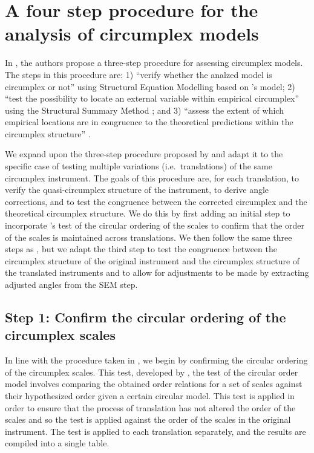 \documentclass[
  authoryear,
  preprint,
  3p]{elsarticle}
\begin{document}
\section{A four step procedure for the analysis of circumplex
models}\label{a-four-step-procedure-for-the-analysis-of-circumplex-models}

In \citet{Rogoza2021three}, the authors propose a three-step procedure
for assessing circumplex models. The steps in this procedure are: 1)
``verify whether the analzed model is circumplex or not'' using
Structural Equation Modelling based on \citet{Browne1992Circumplex}'s
model; 2) ``test the possibility to locate an external variable within
empirical circumplex'' using the Structural Summary Method
\citep{Gurtman1994differentiating}; and 3) ``assess the extent of which
empirical locations are in congruence to the theoretical predictions
within the circumplex structure'' \citep{Rogoza2021three}.

We expand upon the three-step procedure proposed by
\citet{Rogoza2021three} and adapt it to the specific case of testing
multiple variations (i.e.~translations) of the same circumplex
instrument. The goals of this procedure are, for each translation, to
verify the quasi-circumplex structure of the instrument, to derive angle
corrections, and to test the congruence between the corrected circumplex
and the theoretical circumplex structure. We do this by first adding an
initial step to incorporate \citet{Rounds2000Tinsley}'s test of the
circular ordering of the scales to confirm that the order of the scales
is maintained across translations. We then follow the same three steps
as \citet{Rogoza2021three}, but we adapt the third step to test the
congruence between the circumplex structure of the original instrument
and the circumplex structure of the translated instruments and to allow
for adjustments to be made by extracting adjusted angles from the SEM
step.

\subsection{Step 1: Confirm the circular ordering of the circumplex
scales}\label{step-1-confirm-the-circular-ordering-of-the-circumplex-scales}

In line with the procedure taken in \citet{Gurtman2000Interpersonal}, we
begin by confirming the circular ordering of the circumplex scales. This
test, developed by \citet{Rounds2000Tinsley}, the test of the circular
order model involves comparing the obtained order relations for a set of
scales against their hypothesized order given a certain circular model.
This test is applied in order to ensure that the process of translation
has not altered the order of the scales and so the test is applied
against the order of the scales in the original instrument. The test is
applied to each translation separately, and the results are compiled
into a single table.
\end{document}

